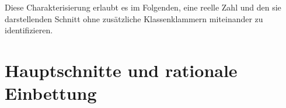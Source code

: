 Diese Charakterisierung erlaubt es im Folgenden, eine reelle Zahl und den sie
darstellenden Schnitt ohne zusätzliche Klassenklammern miteinander zu
identifizieren.

\section{Hauptschnitte und rationale Einbettung}


